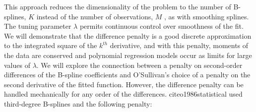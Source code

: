 \documentclass[12pt]{article}
\theoremstyle{definition}
\begin{document}
This approach reduces the dimensionality of the problem to the number of B-splines, $K$ instead of the number of observations, $M$ , as with smoothing splines. The tuning parameter $\lambda$ permits continuous control over smoothness of the fit. We will demonstrate that the difference penalty is a good discrete approximation to the integrated square of the $k^{th}$ derivative, and with this penalty, moments of the data are conserved and polynomial regression models occur as limits for large values of $\lambda$. We will explore the connection between a penalty on second-order differences of the B-spline coefficients and O'Sullivan's choice of a penalty on the second derivative of the fitted function. However, the difference penalty can be handled mechanically for any order of the differences.
cite{o1986statistical} used third-degree B-splines and the following penalty:
\end{document}

